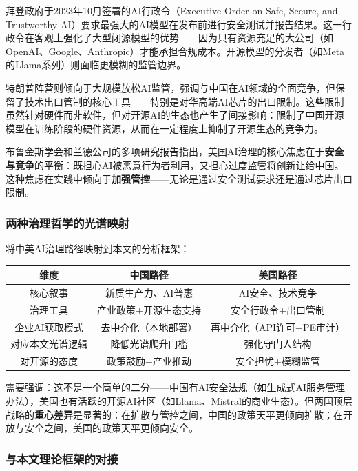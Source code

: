 拜登政府于2023年10月签署的AI行政令（Executive Order on Safe, Secure, and Trustworthy AI）要求最强大的AI模型在发布前进行安全测试并报告结果。这一行政令在客观上强化了大型闭源模型的优势——因为只有资源充足的大公司（如OpenAI、Google、Anthropic）才能承担合规成本。开源模型的分发者（如Meta的Llama系列）则面临更模糊的监管边界。

特朗普阵营则倾向于大规模放松AI监管，强调与中国在AI领域的全面竞争，但保留了技术出口管制的核心工具——特别是对华高端AI芯片的出口限制。这些限制虽然针对硬件而非软件，但对开源AI的生态也产生了间接影响：限制了中国开源模型在训练阶段的硬件资源，从而在一定程度上抑制了开源生态的竞争力。

布鲁金斯学会和兰德公司的多项研究报告指出，美国AI治理的核心焦虑在于\textbf{安全与竞争}的平衡：既担心AI被恶意行为者利用，又担心过度监管将创新让给中国。这种焦虑在实践中倾向于\textbf{加强管控}——无论是通过安全测试要求还是通过芯片出口限制。

\subsubsection{两种治理哲学的光谱映射}

将中美AI治理路径映射到本文的分析框架：

\begin{center}
\begin{tabular}{c|c|c}
\hline
维度 & 中国路径 & 美国路径 \\
\hline
核心叙事 & 新质生产力、AI普惠 & AI安全、技术竞争 \\
治理工具 & 产业政策+开源生态支持 & 安全行政令+出口管制 \\
企业AI获取模式 & 去中介化（本地部署）& 再中介化（API许可+PE审计） \\
对应本文光谱逻辑 & 降低光谱爬升门槛 & 强化守门人结构 \\
对开源的态度 & 政策鼓励+产业推动 & 安全担忧+模糊监管 \\
\hline
\end{tabular}
\end{center}

需要强调：这不是一个简单的二分——中国有AI安全法规（如生成式AI服务管理办法），美国也有活跃的开源AI社区（如Llama、Mistral的商业生态）。但两国顶层战略的\textbf{重心差异}是显著的：在扩散与管控之间，中国的政策天平更倾向扩散；在开放与安全之间，美国的政策天平更倾向安全。

\subsubsection{与本文理论框架的对接}

